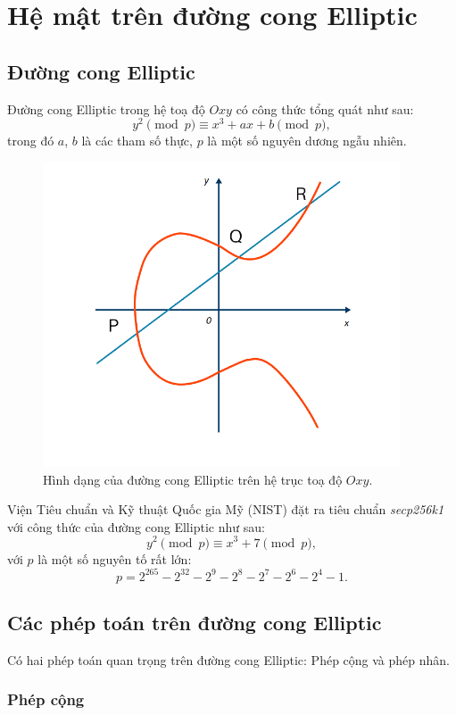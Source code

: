 \section{Hệ mật trên đường cong Elliptic}

\subsection{Đường cong Elliptic}

Đường cong Elliptic trong hệ toạ độ $Oxy$ có công thức tổng quát như sau:
$$
y^2\pmod{p}\equiv x^3+ax+b\pmod{p},
$$
trong đó $a$, $b$ là các tham số thực, $p$ là một số nguyên dương ngẫu nhiên.\\

\begin{figure}[!ht]
    \centering
    \includegraphics[width=400px]{anh/mat-ma-hoa-khoa-cong-khai/ecc.png}
    \caption{Hình dạng của đường cong Elliptic trên hệ trục toạ độ $Oxy$.}
\end{figure}

Viện Tiêu chuẩn và Kỹ thuật Quốc gia Mỹ (NIST) đặt ra tiêu chuẩn \textit{secp256k1} với công thức của đường cong Elliptic như sau:
$$
y^2\pmod{p}\equiv x^3+7\pmod{p},
$$
với $p$ là một số nguyên tố rất lớn:
$$
p=2^{265}-2^{32}-2^9-2^8-2^7-2^6-2^4-1.
$$

\subsection{Các phép toán trên đường cong Elliptic}

Có hai phép toán quan trọng trên đường cong Elliptic: Phép cộng và phép nhân.

\subsubsection*{Phép cộng}

